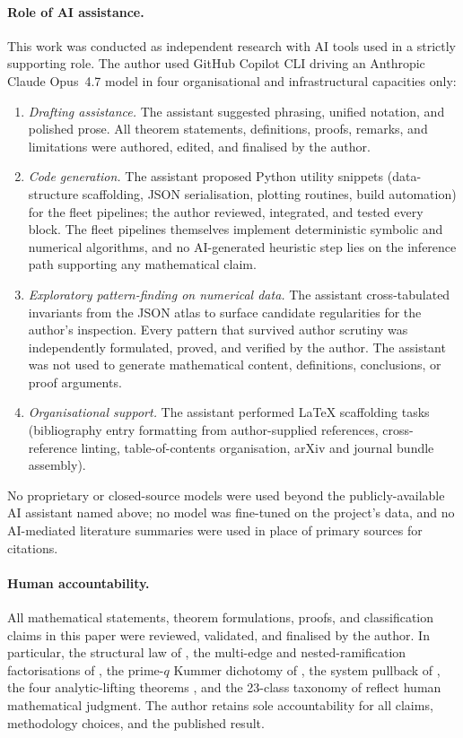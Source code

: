 \documentclass[11pt,a4paper]{article}
\theoremstyle{plain}
\theoremstyle{definition}
\theoremstyle{remark}
\begin{document}
\paragraph{Role of AI assistance.}
This work was conducted as independent research with AI tools used in
a strictly supporting role. The author used GitHub Copilot CLI driving
an Anthropic Claude Opus~4.7 model in four organisational and
infrastructural capacities only:
\begin{enumerate}[label=(\roman*),leftmargin=2em,itemsep=2pt,topsep=2pt]
\item \emph{Drafting assistance.} The assistant suggested phrasing,
  unified notation, and polished prose. All theorem statements,
  definitions, proofs, remarks, and limitations were authored,
  edited, and finalised by the author.
\item \emph{Code generation.} The assistant proposed Python utility
  snippets (data-structure scaffolding, JSON serialisation, plotting
  routines, build automation) for the fleet pipelines; the author
  reviewed, integrated, and tested every block. The fleet pipelines
  themselves implement deterministic symbolic and numerical
  algorithms, and no AI-generated heuristic step lies on the
  inference path supporting any mathematical claim.
\item \emph{Exploratory pattern-finding on numerical data.} The
  assistant cross-tabulated invariants from the JSON atlas to surface
  candidate regularities for the author's inspection. Every pattern
  that survived author scrutiny was independently formulated, proved,
  and verified by the author. The assistant was not used to generate
  mathematical content, definitions, conclusions, or proof arguments.
\item \emph{Organisational support.} The assistant performed LaTeX
  scaffolding tasks (bibliography entry formatting from
  author-supplied references, cross-reference linting,
  table-of-contents organisation, arXiv and journal bundle assembly).
\end{enumerate}
No proprietary or closed-source models were used beyond the
publicly-available AI assistant named above; no model was fine-tuned on
the project's data, and no AI-mediated literature summaries were used
in place of primary sources for citations.

\paragraph{Human accountability.}
All mathematical statements, theorem formulations, proofs, and
classification claims in this paper were reviewed, validated, and
finalised by the author. In particular, the structural law of
, the multi-edge and nested-ramification factorisations
of , the prime-$q$ Kummer dichotomy of
, the system pullback of , the four
analytic-lifting theorems , and
the 23-class taxonomy of  reflect human mathematical
judgment. The author retains sole accountability for all claims,
methodology choices, and the published result.
\end{document}
